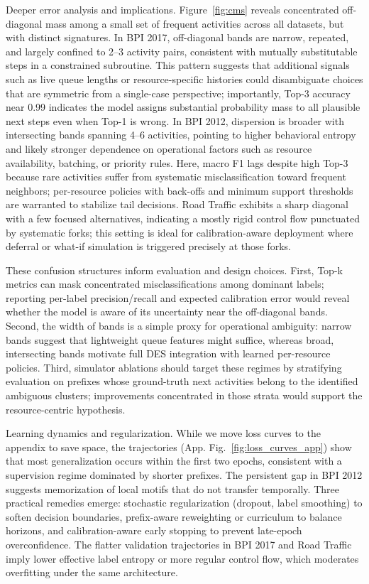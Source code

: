 \documentclass{article}
\theoremstyle{plain}
\theoremstyle{definition}
\theoremstyle{remark}
\begin{document}
	Deeper error analysis and implications. Figure~\ref{fig:cms} reveals concentrated off-diagonal mass among a small set of frequent activities across all datasets, but with distinct signatures. In BPI 2017, off-diagonal bands are narrow, repeated, and largely confined to 2--3 activity pairs, consistent with mutually substitutable steps in a constrained subroutine. This pattern suggests that additional signals such as live queue lengths or resource-specific histories could disambiguate choices that are symmetric from a single-case perspective; importantly, Top-3 accuracy near 0.99 indicates the model assigns substantial probability mass to all plausible next steps even when Top-1 is wrong. In BPI 2012, dispersion is broader with intersecting bands spanning 4--6 activities, pointing to higher behavioral entropy and likely stronger dependence on operational factors such as resource availability, batching, or priority rules. Here, macro F1 lags despite high Top-3 because rare activities suffer from systematic misclassification toward frequent neighbors; per-resource policies with back-offs and minimum support thresholds are warranted to stabilize tail decisions. Road Traffic exhibits a sharp diagonal with a few focused alternatives, indicating a mostly rigid control flow punctuated by systematic forks; this setting is ideal for calibration-aware deployment where deferral or what-if simulation is triggered precisely at those forks.
	
	These confusion structures inform evaluation and design choices. First, Top-k metrics can mask concentrated misclassifications among dominant labels; reporting per-label precision/recall and expected calibration error would reveal whether the model is aware of its uncertainty near the off-diagonal bands. Second, the width of bands is a simple proxy for operational ambiguity: narrow bands suggest that lightweight queue features might suffice, whereas broad, intersecting bands motivate full DES integration with learned per-resource policies. Third, simulator ablations should target these regimes by stratifying evaluation on prefixes whose ground-truth next activities belong to the identified ambiguous clusters; improvements concentrated in those strata would support the resource-centric hypothesis.
	
	Learning dynamics and regularization. While we move loss curves to the appendix to save space, the trajectories (App. Fig.~\ref{fig:loss_curves_app}) show that most generalization occurs within the first two epochs, consistent with a supervision regime dominated by shorter prefixes. The persistent gap in BPI 2012 suggests memorization of local motifs that do not transfer temporally. Three practical remedies emerge: stochastic regularization (dropout, label smoothing) to soften decision boundaries, prefix-aware reweighting or curriculum to balance horizons, and calibration-aware early stopping to prevent late-epoch overconfidence. The flatter validation trajectories in BPI 2017 and Road Traffic imply lower effective label entropy or more regular control flow, which moderates overfitting under the same architecture.
	
\end{document}
